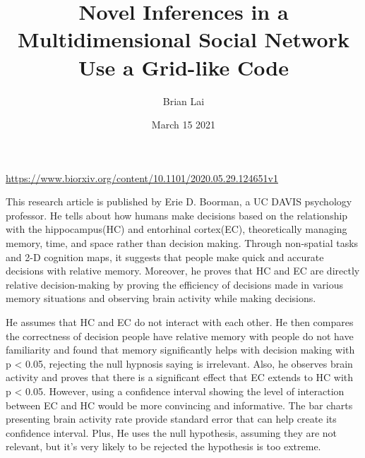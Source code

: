 \documentclass{article}
\title{Novel Inferences in a Multidimensional Social Network
 Use a Grid-like Code}
\author{Brian Lai}
\date{March 15 2021}
\begin{document}
\maketitle

\begin{center}
\par
\href{https://www.biorxiv.org/content/10.1101/2020.05.29.124651v1}{https://www.biorxiv.org/content/10.1101/2020.05.29.124651v1}
\end{center}

\setlength{\parindent}{10ex}
This research article is published by Erie D. Boorman, a UC DAVIS psychology professor. He tells about how humans
 make decisions based on the relationship with the hippocampus(HC) and entorhinal cortex(EC), theoretically managing
 memory, time, and space rather than decision making. Through non-spatial tasks and 2-D cognition maps, it suggests
 that people make quick and accurate decisions with relative memory. Moreover, he proves that HC and EC are directly
 relative decision-making by proving the efficiency of decisions made in various memory situations and observing brain
 activity while making decisions.
\par
He assumes that HC and EC do not interact with each other. He then compares the correctness of decision people have
 relative memory with people do not have familiarity and found that memory significantly helps with decision making
 with p < 0.05, rejecting the null hypnosis saying is irrelevant. Also, he observes brain activity and proves that
 there is a significant effect that EC extends to HC with p < 0.05. However, using a confidence interval showing the
 level of interaction between EC and HC would be more convincing and informative. The bar charts presenting brain
 activity rate provide standard error that can help create its confidence interval. Plus, He uses the null hypothesis,
 assuming they are not relevant, but it’s very likely to be rejected the hypothesis is too extreme.
\end{document}
